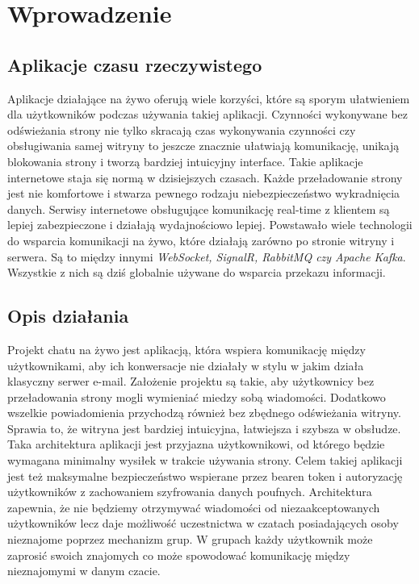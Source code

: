 \documentclass[12pt,a4paper]{article}
\begin{document}
\section{Wprowadzenie} 

\subsection{Aplikacje czasu rzeczywistego}
\hspace*{0.7cm} Aplikacje działające na żywo oferują wiele korzyści, które są sporym ułatwieniem dla użytkowników podczas używania takiej aplikacji. Czynności wykonywane
bez odświeżania strony nie tylko skracają czas wykonywania czynności czy obsługiwania samej witryny to jeszcze znacznie ułatwiają komunikację, unikają 
blokowania strony i tworzą bardziej intuicyjny interface. Takie aplikacje internetowe staja się normą w dzisiejszych czasach. Każde przeładowanie strony jest
nie komfortowe i stwarza pewnego rodzaju niebezpieczeństwo wykradnięcia danych. Serwisy internetowe obsługujące komunikację real-time z klientem są lepiej 
zabezpieczone i działają wydajnościowo lepiej. Powstawało wiele technologii do wsparcia komunikacji na żywo, które działają zarówno po stronie witryny i
serwera. Są to między innymi \textit{WebSocket, SignalR, RabbitMQ czy Apache Kafka}. Wszystkie z nich są dziś globalnie używane do wsparcia przekazu informacji.

\subsection{Opis działania}
\hspace*{0.7cm} Projekt chatu na żywo jest aplikacją, która wspiera komunikację między użytkownikami, aby ich konwersacje nie działały w stylu w jakim działa klasyczny serwer
e-mail. Założenie projektu są takie, aby użytkownicy bez przeładowania strony mogli wymieniać miedzy sobą wiadomości. Dodatkowo wszelkie powiadomienia
przychodzą również bez zbędnego odświeżania witryny. Sprawia to, że witryna jest bardziej intuicyjna, łatwiejsza i szybsza w obsłudze. Taka architektura
aplikacji jest przyjazna użytkownikowi, od którego będzie wymagana minimalny wysiłek w trakcie używania strony. Celem takiej aplikacji jest też maksymalne 
bezpieczeństwo wspierane przez bearen token i autoryzację użytkowników z zachowaniem szyfrowania danych poufnych. Architektura zapewnia, że nie będziemy otrzymywać wiadomości od niezaakceptowanych użytkowników lecz daje możliwość uczestnictwa w czatach posiadających osoby nieznajome poprzez mechanizm grup. W grupach każdy użytkownik może zaprosić swoich znajomych co może spowodować komunikację między nieznajomymi w danym czacie.
\end{document}
